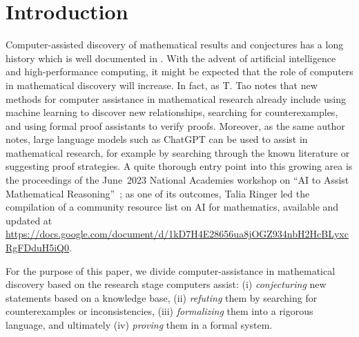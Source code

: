 \documentclass[]{ceurart}
\begin{document}
\maketitle

\section{Introduction}

Computer-assisted discovery of mathematical results and conjectures has a long history which is well documented in \cite{larson2017automated,delavina2005history}. With the advent of artificial intelligence and high-performance computing, it might be expected that the role of computers in mathematical discovery will increase. In fact, as T. Tao \cite{tao2025machine} notes that new methods for computer assistance in mathematical research already include using machine learning to discover new relationships, searching for counterexamples, and using formal proof assistants to verify proofs. Moreover, as the same author notes, large language models such as ChatGPT can be used to assist in mathematical research, for example by searching through the known literature or suggesting proof strategies. A quite thorough entry point into this growing area is the proceedings of the June~2023 National Academies workshop on ``AI to Assist Mathematical Reasoning''~\cite{koretsky2023ai}; as one of its outcomes, Talia Ringer led the compilation of a community resource list on AI for mathematics, available and updated at \url{https://docs.google.com/document/d/1kD7H4E28656ua8jOGZ934nbH2HcBLyxcRgFDduH5iQ0}.

For the purpose of this paper, we divide computer-assistance in mathematical discovery based on the research stage computers assist: (i) \emph{conjecturing} new statements based on a knowledge base, (ii) \emph{refuting} them by searching for counterexamples or inconsistencies, (iii) \emph{formalizing} them into a rigorous language, and ultimately (iv) \emph{proving} them in a formal system.
\end{document}
